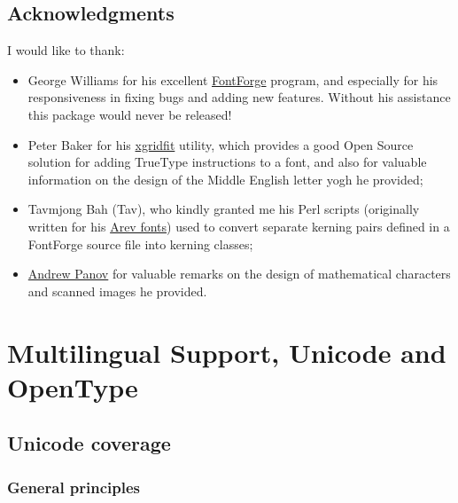 \documentclass[12pt,a4paper,openany]{book}
\begin{document}
\section{Acknowledgments}

I would like to thank:

\begin{itemize}

\item George Williams for his excellent
\href{http://fontforge.sourceforge.net}{FontForge} program, and
especially for his responsiveness in fixing bugs and adding new features.
Without his assistance this package would never be released!

\item Peter Baker for his \href{http://xgridfit.sourceforge.net}{xgridfit}
utility, which provides a good Open Source solution for adding TrueType
instructions to a font, and also for valuable information on the design of
the Middle English letter yogh he provided;

\item Tavmjong Bah (Tav), who kindly granted me his Perl scripts (originally
written for his \href{http://tavmjong.free.fr/FONTS/}{Arev fonts}) used to
convert separate kerning pairs defined in a FontForge source file into
kerning classes;

\item \href{http://canopus.iacp.dvo.ru/~panov/}{Andrew Panov} for valuable
remarks on the design of mathematical characters and scanned images he
provided.

\end{itemize}

\chapter{Multilingual Support, Unicode and OpenType}
\hypertarget{i18n}{}\label{i18n}
\thispagestyle{empty}

\section{Unicode coverage}

\subsection{General principles}
\end{document}
